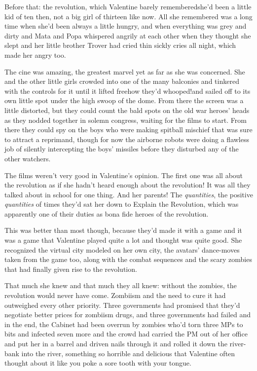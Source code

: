 Before that: the revolution, which Valentine barely
re\-mem\-bered\dash{}she’d been a little kid of ten then, not a big girl of
thirteen like now. All she remembered was a long time when she’d
been always a little hungry, and when everything was grey and dirty
and Mata and Popa whispered angrily at each other when they thought
she slept and her little brother Trover had cried thin sickly cries
all night, which made her angry too.

The cine was amazing, the greatest marvel yet as far as she was
concerned. She and the other little girls crowded into one of the
many balconies and tinkered with the controls for it until it
lifted free\dash{}how they’d whooped!\dash{}and sailed off to its own little
spot under the high swoop of the dome. From there the screen was a
little distorted, but they could count the bald spots on the old
war heroes’ heads as they nodded together in solemn congress,
waiting for the films to start. From there they could spy on the
boys who were making spitball mischief that was sure to attract a
reprimand, though for now the airborne robots were doing a flawless
job of silently intercepting the boys’ missiles before they
disturbed any of the other watchers.

The films weren’t very good in Va\-len\-tine’s opinion. The first one
was all about the revolution as if she hadn’t heard enough about
the revolution! It was all they talked about in school for one
thing. And her parents! The \emph{quantities}, the positive
\emph{quantities} of times they’d sat her down to Explain the
Revolution, which was apparently one of their duties as bona fide
heroes of the revolution.

This was better than most though, because they’d made it with a
game and it was a game that Valentine played quite a lot and
thought was quite good. She recognized the virtual city modeled on
her own city, the avatars’ dance-moves taken from the game too,
along with the combat sequences and the scary zombies that had
finally given rise to the revolution.

That much she knew and that much they all knew: without the
zombies, the revolution would never have come. Zombiism and the
need to cure it had outweighed every other priority. Three
governments had promised that they’d negotiate better prices for
zombiism drugs, and three governments had failed and in the end,
the Cabinet had been overrun by zombies who’d torn three MPs to
bits and infected seven more and the crowd had carried the PM out
of her office and put her in a barrel and driven nails through it
and rolled it down the river-bank into the river, something so
horrible and delicious that Valentine often thought about it like
you poke a sore tooth with your tongue.

